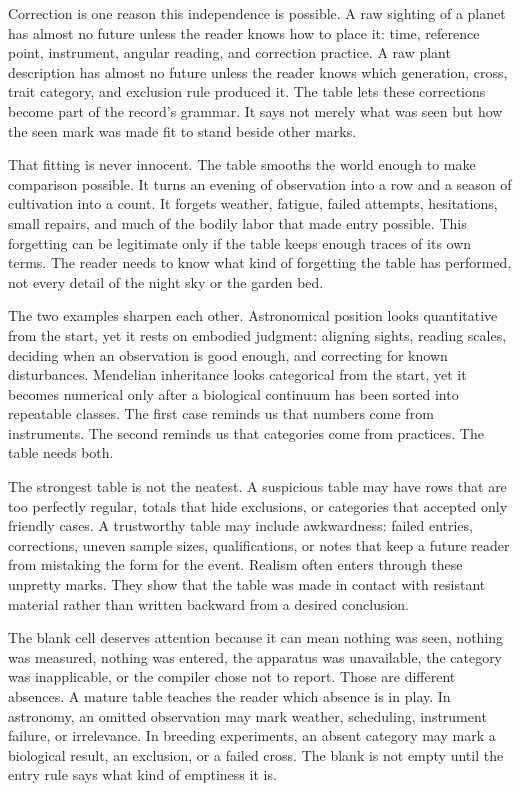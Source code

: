 Correction is one reason this independence is possible. A raw sighting of
a planet has almost no future unless the reader knows how to place it: time,
reference point, instrument, angular reading, and correction practice. A
raw plant description has almost no future unless the reader knows which
generation, cross, trait category, and exclusion rule produced it. The table lets these corrections become
part of the record's grammar. It says not merely what was seen but how the
seen mark was made fit to stand beside other marks.

That fitting is never innocent. The table smooths the world enough to make
comparison possible. It turns an evening of observation into a row and a
season of cultivation into a count. It forgets weather, fatigue, failed
attempts, hesitations, small repairs, and much of the bodily labor that
made entry possible. This forgetting can be legitimate only if the table
keeps enough traces of its own terms. The reader needs to know what kind of
forgetting the table has performed, not every detail of the night sky or
the garden bed.

The two examples sharpen each other. Astronomical position looks
quantitative from the start, yet it rests on embodied judgment: aligning
sights, reading scales, deciding when an observation is good enough, and
correcting for known disturbances. Mendelian inheritance looks categorical
from the start, yet it becomes numerical only after a biological continuum
has been sorted into repeatable classes. The first case reminds us that
numbers come from instruments. The second reminds us that categories come
from practices. The table needs both.

The strongest table is not the neatest. A suspicious table may have rows
that are too perfectly regular, totals that hide exclusions, or categories
that accepted only friendly cases. A trustworthy table may include
awkwardness: failed entries, corrections, uneven sample sizes,
qualifications, or notes that keep a future reader from mistaking the form
for the event. Realism often enters through these unpretty marks. They show
that the table was made in contact with resistant material rather than
written backward from a desired conclusion.

The blank cell deserves attention because it can mean nothing was seen,
nothing was measured, nothing was entered, the apparatus was unavailable,
the category was inapplicable, or the compiler chose not to report. Those
are different absences. A mature table teaches the reader which absence is
in play. In astronomy, an omitted observation may mark weather, scheduling,
instrument failure, or irrelevance. In breeding experiments, an absent
category may mark a biological result, an exclusion, or a failed cross.
The blank is not empty until the entry rule says what kind of emptiness it
is.

